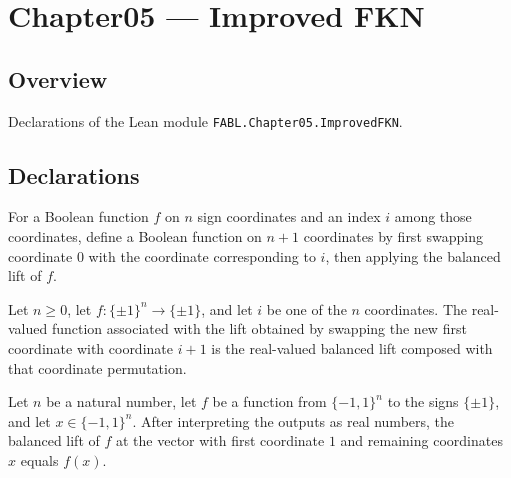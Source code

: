 \chapter{Chapter05 — Improved FKN}
\section{Overview}

Declarations of the Lean module \texttt{FABL.Chapter05.ImprovedFKN}.

\section{Declarations}

\begin{definition}
\label{FABL.improvedFKNBalancedLift}
\leanok
{}
For a Boolean function $f$ on $n$ sign coordinates and an index $i$ among those
coordinates, define a Boolean function on $n+1$ coordinates by first swapping coordinate
$0$ with the coordinate corresponding to $i$, then applying the balanced lift of $f$.
\end{definition}

\begin{theorem}
\label{FABL.improvedFKNBalancedLift_toReal}
\leanok
{}
Let $n\ge0$, let $f\colon\{\pm1\}^n\to\{\pm1\}$, and let $i$ be one of the $n$
coordinates. The real-valued function associated with the lift obtained by swapping the
new first coordinate with coordinate $i+1$ is the real-valued balanced lift composed
with that coordinate permutation.
\end{theorem}

\begin{theorem}
\label{FABL.balancedFKNLift_toReal_fin_cons_one'}
\leanok
{}
Let $n$ be a natural number, let $f$ be a function from $\{-1,1\}^n$ to the signs
$\{\pm1\}$, and let $x\in\{-1,1\}^n$. After interpreting the outputs as real
numbers, the balanced lift of $f$ at the vector with first coordinate $1$ and remaining
coordinates $x$ equals $f(x)$.
\end{theorem}

